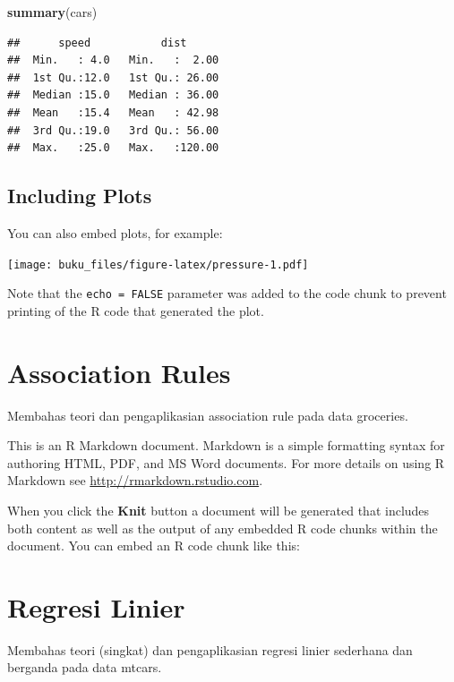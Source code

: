 \documentclass[]{book}
\newenvironment{Shaded}{\begin{snugshade}}{\end{snugshade}}
\newcommand{\KeywordTok}[1]{\textcolor[rgb]{0.13,0.29,0.53}{\textbf{#1}}}
\newcommand{\NormalTok}[1]{#1}
\begin{document}
\begin{Shaded}
\begin{Highlighting}[]
\KeywordTok{summary}\NormalTok{(cars)}
\end{Highlighting}
\end{Shaded}

\begin{verbatim}
##      speed           dist       
##  Min.   : 4.0   Min.   :  2.00  
##  1st Qu.:12.0   1st Qu.: 26.00  
##  Median :15.0   Median : 36.00  
##  Mean   :15.4   Mean   : 42.98  
##  3rd Qu.:19.0   3rd Qu.: 56.00  
##  Max.   :25.0   Max.   :120.00
\end{verbatim}

\hypertarget{including-plots}{%
\section{Including Plots}\label{including-plots}}

You can also embed plots, for example:

\texttt{[image: buku\_files/figure-latex/pressure-1.pdf]}

Note that the \texttt{echo\ =\ FALSE} parameter was added to the code chunk to prevent printing of the R code that generated the plot.

\hypertarget{arules}{%
\chapter{Association Rules}\label{arules}}

Membahas teori dan pengaplikasian association rule pada data groceries.

This is an R Markdown document. Markdown is a simple formatting syntax for authoring HTML, PDF, and MS Word documents. For more details on using R Markdown see \url{http://rmarkdown.rstudio.com}.

When you click the \textbf{Knit} button a document will be generated that includes both content as well as the output of any embedded R code chunks within the document. You can embed an R code chunk like this:

\hypertarget{linearreg}{%
\chapter{Regresi Linier}\label{linearreg}}

Membahas teori (singkat) dan pengaplikasian regresi linier sederhana dan berganda pada data mtcars.
\end{document}

